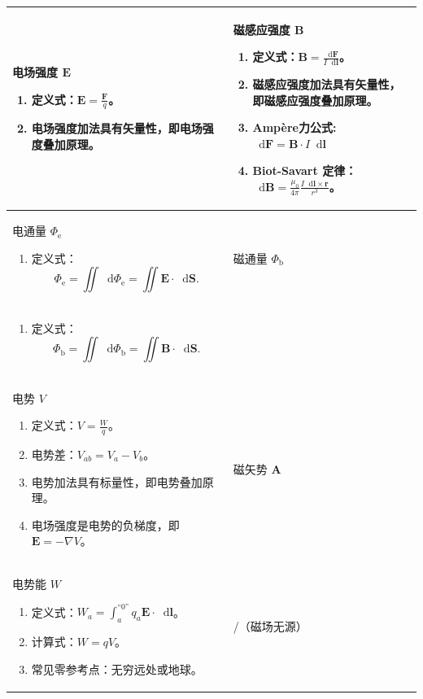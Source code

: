 \documentclass[UTF8,fontset=fandol,zihao=5]{ctexart}
\newcommand{\vect}[1]{\bm{#1}}
\newcommand{\dif}{\mathop{}\!\mathrm{d}}
\begin{document}
\begin{longtable}{|>{\raggedright\arraybackslash}p{}|>{\raggedright\arraybackslash}p{}|}
\centering 电场强度 \(\vect E\)
\begin{enumerate}
  \item 定义式：\(\displaystyle\vect E=\frac{\vect F}{q}\)。
  \item 电场强度加法具有矢量性，即电场强度叠加原理。
\end{enumerate}
& \centering\arraybackslash 磁感应强度 \(\vect B\)
\begin{enumerate}
  \item 定义式：\(\displaystyle\vect B=\frac{\dif \vect F}{I \dif \vect l}\)。
  \item 磁感应强度加法具有矢量性，即磁感应强度叠加原理。
  \item Ampère力公式: \(\dif \vect F = \vect B \cdot I \dif \vect l\)
  \item Biot-Savart 定律：\(\displaystyle \dif \vect B = \frac{\mu_0}{4\pi} \frac{I \dif \vect l \times \vect r}{r^3}\)。
\end{enumerate}
\\ \hline

\centering 电通量 \(\varPhi_{\mathrm e}\)
\begin{enumerate}
  \item 定义式：
  \[
    \varPhi_{\mathrm e}=\iint\dif\varPhi_{\mathrm e}=\iint\vect E\cdot\dif\vect S.
  \]
\end{enumerate}
\vspace{0.45em}
& \centering\arraybackslash 磁通量 \(\varPhi_{\mathrm b}\)\\ 
\begin{enumerate}
  \item 定义式：
  \[
    \varPhi_{\mathrm b}=\iint\dif\varPhi_{\mathrm b}=\iint\vect B\cdot\dif\vect S.
  \]
\end{enumerate}\\
\hline

\centering 电势 \(V\)
\begin{enumerate}
  \item 定义式：\(\displaystyle V=\frac{W}{q}\)。
  \item 电势差：\(V_{ab}=V_a-V_b\)。
  \item 电势加法具有标量性，即电势叠加原理。
  \item 电场强度是电势的负梯度，即 \(\vect E=-\nabla V\)。
\end{enumerate}
& \centering\arraybackslash 磁矢势 \(\vect A\)\\ \hline

\centering 电势能 \(W\)
\begin{enumerate}
  \item 定义式：\(\displaystyle W_a=\int_a^{\text{``0''}}q_a\vect E\cdot\dif\vect l\)。
  \item 计算式：\(W=qV\)。
  \item 常见零参考点：无穷远处或地球。
\end{enumerate}
& \centering\arraybackslash /（磁场无源）\\ \hline


\end{longtable}
\end{document}
